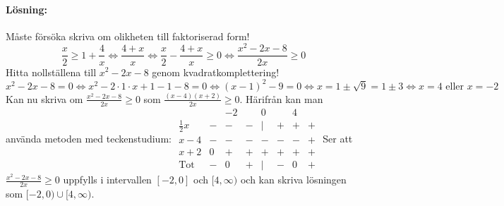 \paragraph{Lösning:}
Måste försöka skriva om olikheten till faktoriserad form!
\begin{equation*}
    \frac{x}{2}\geq 1+\frac{4}{x}\Leftrightarrow
    \frac{4+x}{x}\Leftrightarrow
    \frac{x}{2}-\frac{4+x}{x}\geq 0\Leftrightarrow
    \frac{x^2-2x-8}{2x}\geq 0
\end{equation*}
Hitta nollställena till $x^2-2x-8$ genom kvadratkomplettering!
\begin{equation*}
    x^2-2x-8=0 \Leftrightarrow
    x^2-2\cdot 1\cdot x+1-1-8=0 \Leftrightarrow
    (x-1)^2-9=0\Leftrightarrow
    x=1\pm \sqrt{9}=1\pm 3\Leftrightarrow
    x=4\text{ eller } x=-2
\end{equation*}
Kan nu skriva om $\frac{x^2-2x-8}{2x}\geq 0$ som $\frac{(x-4)(x+2)}{2x}\geq 0$.
Härifrån kan man använda metoden med teckenstudium:
$\begin{matrix}
                     &   & -2 &   & 0 &   & 4 &   \\
        \frac{1}{2}x & - & -  & - & | & + & + & + \\
        x-4          & - & -  & - & - & - & - & + \\
        x+2          & 0 & +  & + & + & + & + & + \\
        \text{Tot}   & - & 0  & + & | & - & 0 & +
    \end{matrix}$
Ser att $\frac{x^2-2x-8}{2x}\geq 0$ uppfylls i intervallen $[-2,0]$ och $[4,\infty)$ och kan skriva lösningen som $[-2,0)\cup[4,\infty)$.
